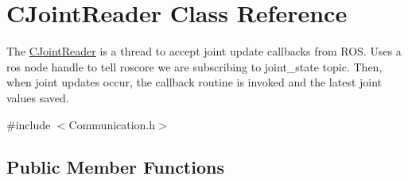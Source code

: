 \hypertarget{classCJointReader}{\section{C\-Joint\-Reader Class Reference}
\label{classCJointReader}
}


The \hyperlink{classCJointReader}{C\-Joint\-Reader} is a thread to accept joint update callbacks from R\-O\-S. Uses a ros node handle to tell roscore we are subscribing to joint\-\_\-state topic. Then, when joint updates occur, the callback routine is invoked and the latest joint values saved.  




{\ttfamily \#include $<$Communication.\-h$>$}

\subsection*{Public Member Functions}
